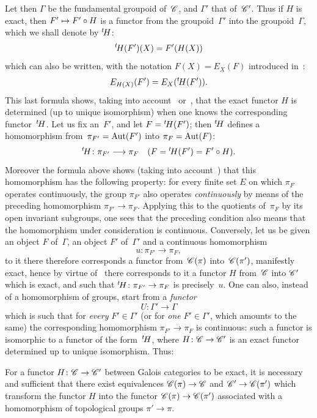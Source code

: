 Let then $\Gamma$ be the fundamental groupoid of~$\cal{C}$, and
$\Gamma'$ that of~$\cal{C'}$. Thus if
$H$ is exact, then $F' \mto F' \circ H$ is a functor from the
groupoid~$\Gamma'$ into the groupoid~$\Gamma$, which we shall
denote by ${}^t\!H$:
$$
{}^t\!H (F')(X)=F' (H(X))
$$
which can also be written, with the notation $F(X)=E_X (F)$
introduced in~\no {}:
$$
E_{H(X)} (F')=E_X ({}^t\!H(F')).
$$
This last formula shows, taking into account~
or~, that the exact functor $H$ is determined (up to
unique isomorphism) when one knows the
corresponding functor~${}^t\!H$. Let us fix an~$F'$, and let $F={}^t\!H (F')$;
then ${}^t\!H$ defines a homomorphism from~$\pi_{F'} =\operatorname{Aut}(F')$
into $\pi_F =\operatorname{Aut}(F)$:
$$
\tH\colon \pi_{F'} \to \pi_F \quad (F=\tH (F')=F' \circ H).
$$
Moreover the formula above shows (taking into account~)
that this homomorphism has the following property: for every
finite set $E$ on which $\pi_F$ operates continuously, the group
$\pi_{F'}$ also operates \emph{continuously} by means of
the preceding homomorphism $\pi_{F'} \to
\pi_F$. \hbox{Applying} this to the quotients of~$\pi_F$ by its open
invariant subgroups, one sees that the preceding condition
also means that the homomorphism under consideration is
continuous. Conversely,
let us be given
an object $F$ of~$\Gamma$, an
object $F'$ of~$\Gamma'$ and a continuous homomorphism
$$
u\colon \pi_{F'} \to \pi_F ,
$$
to it there therefore corresponds a functor from~$\cal{C} (\pi)$
into~$\cal{C}(\pi')$, manifestly exact, hence by virtue
of~ there corresponds to it a functor $H$ from~$\cal{C}$ into
$\cal{C'}$ which is exact, and such that $\tH\colon \pi_{F'} \to \pi_F$
is precisely~$u$. One can also, instead of a
homomorphism of groups, start from a \emph{functor}
$$
U\colon \Gamma' \to \Gamma
$$
which is such that for \emph{every} $F' \in \Gamma'$ (or for \emph{one} $F'
\in \Gamma'$, which amounts to the same) the corresponding homomorphism
$\pi_{F'} \to \pi_F$ is continuous: such a functor is isomorphic to
a functor of the form~${}^t\!H$, where $H\colon \cal{C} \to
\cal{C'}$ is an exact functor determined up to unique
isomorphism. Thus:

\begin{corollary}
\label{V.6.2}
For
a functor $H\colon \cal{C} \to \cal{C'}$ between Galois categories
to be exact, it is necessary and sufficient that there exist
equivalences $\cal{C}(\pi)\to\cal{C}$ and
$\cal{C'}\to\cal{C}(\pi')$
which transform the functor $H$ into the functor
$\cal{C}(\pi)\to\cal{C}(\pi')$ associated with a homomorphism of
topological groups $\pi'\to\pi$.
\end{corollary}

